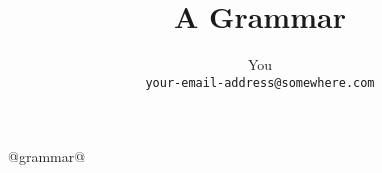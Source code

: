\documentclass[11pt]{article}
\title{A Grammar}
\author{You\\
\texttt{your-email-address@somewhere.com}}
\begin{document}
\maketitle

@grammar@
\end{document}
